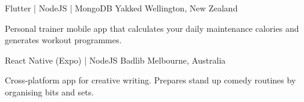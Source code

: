 \begin{cventries}
  \cventry
    { Flutter | NodeJS | MongoDB } %
    {Yakked} %
    {Wellington, New Zealand} %
    {} %
    {
      \begin{cvitems} %
      	\item { Personal trainer mobile app that calculates your daily maintenance calories and generates workout programmes. }
      \end{cvitems}
    }


  \cventry
    { React Native (Expo) | NodeJS } %
    {Badlib} %
    {Melbourne, Australia} %
    {} %
    {
      \begin{cvitems} %
      	\item { Cross-platform app for creative writing. Prepares stand up comedy routines by organising bits and sets.}
      \end{cvitems}
    }
    
    \end{cventries}
